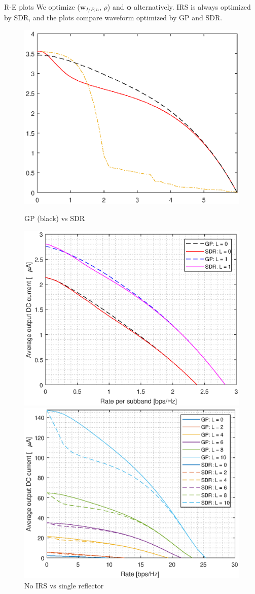 \documentclass[9pt]{beamer}
\begin{document}
\begin{frame}{R-E plots}
    We optimize ($\boldsymbol{w}_{I/P,n}$, $\rho$) and $\boldsymbol{\phi}$ alternatively. IRS is always optimized by SDR, and the plots compare waveform optimized by GP and SDR.
    \begin{figure}[ht]
        \begin{minipage}[b]{0.5\linewidth}
            \centering
            \includegraphics[width=.65\linewidth]{assets/week_29_re_gp_sdr.eps}
            \caption{GP (black) vs SDR}
            \label{fi:gp_sdr}
        \end{minipage}%
        \begin{minipage}[b]{0.5\linewidth}
            \centering
            \includegraphics[width=.65\linewidth]{assets/week_29_re_irs.eps}
            \caption{No IRS vs single reflector}
        \end{minipage}
        \begin{minipage}[b]{0.5\linewidth}
            \centering
            \includegraphics[width=.65\linewidth]{assets/week_29_re_reflector.eps}

\end{minipage}
\end{figure}
\end{frame}
\end{document}
